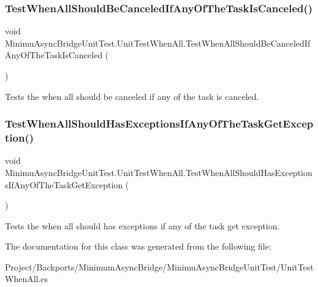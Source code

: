 \subsubsection{\texorpdfstring{Test\+When\+All\+Should\+Be\+Canceled\+If\+Any\+Of\+The\+Task\+Is\+Canceled()}{TestWhenAllShouldBeCanceledIfAnyOfTheTaskIsCanceled()}}
{\footnotesize\ttfamily void Minimu\+Async\+Bridge\+Unit\+Test.\+Unit\+Test\+When\+All.\+Test\+When\+All\+Should\+Be\+Canceled\+If\+Any\+Of\+The\+Task\+Is\+Canceled (\begin{DoxyParamCaption}{ }\end{DoxyParamCaption})\hspace{0.3cm}{\ttfamily [inline]}}



Tests the when all should be canceled if any of the task is canceled. 

\mbox{\label{class_minimu_async_bridge_unit_test_1_1_unit_test_when_all_aec076eff774e6d134c9b65ca23eb3b85}} 
\subsubsection{\texorpdfstring{Test\+When\+All\+Should\+Has\+Exceptions\+If\+Any\+Of\+The\+Task\+Get\+Exception()}{TestWhenAllShouldHasExceptionsIfAnyOfTheTaskGetException()}}
{\footnotesize\ttfamily void Minimu\+Async\+Bridge\+Unit\+Test.\+Unit\+Test\+When\+All.\+Test\+When\+All\+Should\+Has\+Exceptions\+If\+Any\+Of\+The\+Task\+Get\+Exception (\begin{DoxyParamCaption}{ }\end{DoxyParamCaption})\hspace{0.3cm}{\ttfamily [inline]}}



Tests the when all should has exceptions if any of the task get exception. 



The documentation for this class was generated from the following file\+:\begin{DoxyCompactItemize}
\item 
Project/\+Backports/\+Minimum\+Async\+Bridge/\+Minimu\+Async\+Bridge\+Unit\+Test/Unit\+Test\+When\+All.\+cs\end{DoxyCompactItemize}
